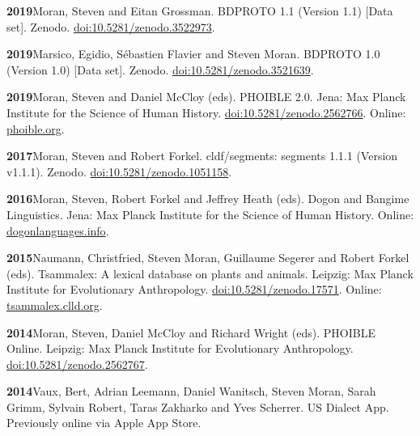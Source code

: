 \documentclass[11pt]{article}
\newcommand{\hangpara}{
 \setlength{\parindent}{0in} %
 \hangindent=0.42in %
}
\begin{document}
\vskip 6pt
\hangpara
{\bf 2019}\hspace{1ex}Moran, Steven and Eitan Grossman. BDPROTO 1.1 (Version 1.1) [Data set]. Zenodo. \href{https://doi.org/10.5281/zenodo.3522973}{doi:10.5281/zenodo.3522973}. %

\vskip 6pt
\hangpara
{\bf 2019}\hspace{1ex}Marsico, Egidio, Sébastien Flavier and Steven Moran. BDPROTO 1.0 (Version 1.0) [Data set]. Zenodo. \href{https://doi.org/10.5281/zenodo.3521639}{doi:10.5281/zenodo.3521639}. %

\vskip 6pt
\hangpara
{\bf 2019}\hspace{1ex}Moran, Steven and Daniel McCloy (eds). PHOIBLE 2.0. Jena: Max Planck Institute for the Science of Human History. \href{https://doi.org/10.5281/zenodo.2562766}{doi:10.5281/zenodo.2562766}. Online: \href{http://phoible.org}{phoible.org}.

\vskip 6pt
\hangpara
{\bf 2017}\hspace{1ex}Moran, Steven and Robert Forkel. cldf/segments: segments 1.1.1 (Version v1.1.1). Zenodo. \href{https://doi.org/10.5281/zenodo.1051158}{doi:10.5281/zenodo.1051158}. %

\vskip 6pt
\hangpara
{\bf 2016}\hspace{1ex}Moran, Steven, Robert Forkel and Jeffrey Heath (eds). Dogon and Bangime Linguistics. Jena: Max Planck Institute for the Science of Human History. Online: \href{http://dogonlanguages.info}{dogonlanguages.info}.

\vskip 6pt
\hangpara
{\bf 2015}\hspace{1ex}Naumann, Christfried, Steven Moran, Guillaume Segerer and Robert Forkel (eds). Tsammalex: A lexical database on plants and animals. Leipzig: Max Planck Institute for Evolutionary Anthropology. \href{https://doi.org/10.5281/zenodo.17571}{doi:10.5281/zenodo.17571}. Online: \href{http://tsammalex.clld.org}{tsammalex.clld.org}.

\vskip 6pt
\hangpara
{\bf 2014}\hspace{1ex}Moran, Steven, Daniel McCloy and Richard Wright (eds). PHOIBLE Online. Leipzig: Max Planck Institute for Evolutionary Anthropology. \href{https://doi.org/10.5281/zenodo.2562767}{doi:10.5281/zenodo.2562767}.

\vskip 6pt
\hangpara
{\bf 2014}\hspace{1ex}Vaux, Bert, Adrian Leemann, Daniel Wanitsch, Steven Moran, Sarah Grimm, Sylvain Robert, Taras Zakharko and Yves Scherrer. US Dialect App. Previously online via Apple App Store. %
\end{document}
